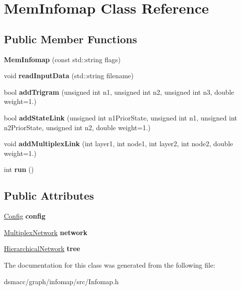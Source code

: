 \hypertarget{classMemInfomap}{}\section{Mem\+Infomap Class Reference}
\label{classMemInfomap}
\subsection*{Public Member Functions}
\begin{DoxyCompactItemize}
\item 
\mbox{\label{classMemInfomap_a9749dbee214026c54bb199ac0c812bd6}} 
{\bfseries Mem\+Infomap} (const std\+::string flags)
\item 
\mbox{\label{classMemInfomap_a15a8f29a213d7e58b2954091bdd17feb}} 
void {\bfseries read\+Input\+Data} (std\+::string filename)
\item 
\mbox{\label{classMemInfomap_af6e2a69195afd819af38ab05720ae843}} 
bool {\bfseries add\+Trigram} (unsigned int n1, unsigned int n2, unsigned int n3, double weight=1.)
\item 
\mbox{\label{classMemInfomap_a68d227a6d56ae70b8e0589f3ffd5fc6c}} 
bool {\bfseries add\+State\+Link} (unsigned int n1\+Prior\+State, unsigned int n1, unsigned int n2\+Prior\+State, unsigned int n2, double weight=1.)
\item 
\mbox{\label{classMemInfomap_a699c7b57d57805ddf79efe0a5cb12542}} 
void {\bfseries add\+Multiplex\+Link} (int layer1, int node1, int layer2, int node2, double weight=1.)
\item 
\mbox{\label{classMemInfomap_a2ba6b32eee1838cb421b376ac281c559}} 
int {\bfseries run} ()
\end{DoxyCompactItemize}
\subsection*{Public Attributes}
\begin{DoxyCompactItemize}
\item 
\mbox{\label{classMemInfomap_ac069836abe651b024f0f8e98e1e75a28}} 
\mbox{\hyperlink{structConfig}{Config}} {\bfseries config}
\item 
\mbox{\label{classMemInfomap_af8fc6302d5ebaf3dceb6e644c37b07a9}} 
\mbox{\hyperlink{classMultiplexNetwork}{Multiplex\+Network}} {\bfseries network}
\item 
\mbox{\label{classMemInfomap_a29fe5cb3396adbdb85a8a6c83dc6db73}} 
\mbox{\hyperlink{classHierarchicalNetwork}{Hierarchical\+Network}} {\bfseries tree}
\end{DoxyCompactItemize}


The documentation for this class was generated from the following file\+:\begin{DoxyCompactItemize}
\item 
dsmacc/graph/infomap/src/Infomap.\+h\end{DoxyCompactItemize}
